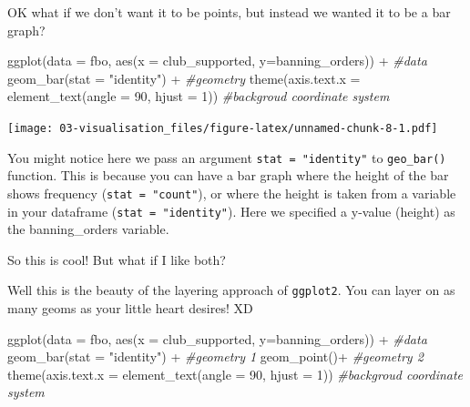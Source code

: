 \documentclass[
]{book}
\newenvironment{Shaded}{\begin{snugshade}}{\end{snugshade}}
\newcommand{\AttributeTok}[1]{\textcolor[rgb]{0.77,0.63,0.00}{#1}}
\newcommand{\CommentTok}[1]{\textcolor[rgb]{0.56,0.35,0.01}{\textit{#1}}}
\newcommand{\DecValTok}[1]{\textcolor[rgb]{0.00,0.00,0.81}{#1}}
\newcommand{\FunctionTok}[1]{\textcolor[rgb]{0.00,0.00,0.00}{#1}}
\newcommand{\NormalTok}[1]{#1}
\newcommand{\SpecialCharTok}[1]{\textcolor[rgb]{0.00,0.00,0.00}{#1}}
\newcommand{\StringTok}[1]{\textcolor[rgb]{0.31,0.60,0.02}{#1}}
\begin{document}
OK what if we don't want it to be points, but instead we wanted it to be a bar graph?

\begin{Shaded}
\begin{Highlighting}[]
\FunctionTok{ggplot}\NormalTok{(}\AttributeTok{data =}\NormalTok{ fbo, }\FunctionTok{aes}\NormalTok{(}\AttributeTok{x =}\NormalTok{ club\_supported, }\AttributeTok{y=}\NormalTok{banning\_orders)) }\SpecialCharTok{+}   \CommentTok{\#data}
   \FunctionTok{geom\_bar}\NormalTok{(}\AttributeTok{stat =} \StringTok{"identity"}\NormalTok{) }\SpecialCharTok{+}                                  \CommentTok{\#geometry}
  \FunctionTok{theme}\NormalTok{(}\AttributeTok{axis.text.x =} \FunctionTok{element\_text}\NormalTok{(}\AttributeTok{angle =} \DecValTok{90}\NormalTok{, }\AttributeTok{hjust =} \DecValTok{1}\NormalTok{))                                                       }\CommentTok{\#backgroud coordinate system}
\end{Highlighting}
\end{Shaded}

\texttt{[image: 03-visualisation\_files/figure-latex/unnamed-chunk-8-1.pdf]}

You might notice here we pass an argument \texttt{stat\ =\ "identity"} to \texttt{geo\_bar()} function. This is because you can have a bar graph where the height of the bar shows frequency (\texttt{stat\ =\ "count"}), or where the height is taken from a variable in your dataframe (\texttt{stat\ =\ "identity"}). Here we specified a y-value (height) as the banning\_orders variable.

So this is cool! But what if I like both?

Well this is the beauty of the layering approach of \texttt{ggplot2}. You can layer on as many geoms as your little heart desires! XD

\begin{Shaded}
\begin{Highlighting}[]
\FunctionTok{ggplot}\NormalTok{(}\AttributeTok{data =}\NormalTok{ fbo, }\FunctionTok{aes}\NormalTok{(}\AttributeTok{x =}\NormalTok{ club\_supported, }\AttributeTok{y=}\NormalTok{banning\_orders)) }\SpecialCharTok{+}  \CommentTok{\#data}
  \FunctionTok{geom\_bar}\NormalTok{(}\AttributeTok{stat =} \StringTok{"identity"}\NormalTok{) }\SpecialCharTok{+}                                  \CommentTok{\#geometry 1 }
  \FunctionTok{geom\_point}\NormalTok{()}\SpecialCharTok{+}                                                  \CommentTok{\#geometry 2}
\FunctionTok{theme}\NormalTok{(}\AttributeTok{axis.text.x =} \FunctionTok{element\_text}\NormalTok{(}\AttributeTok{angle =} \DecValTok{90}\NormalTok{, }\AttributeTok{hjust =} \DecValTok{1}\NormalTok{))                                                      }\CommentTok{\#backgroud coordinate system}
\end{Highlighting}
\end{Shaded}
\end{document}
